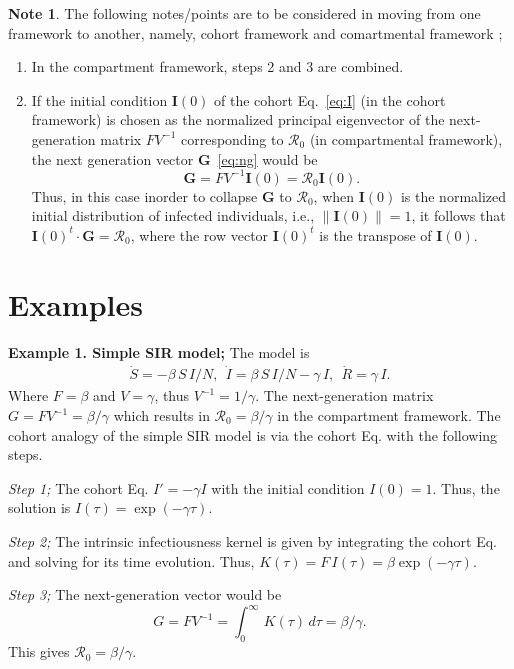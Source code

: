 \documentclass[12pt]{article}
\DeclareRobustCommand\_{\ifmmode\expandafter\subtxt\else\textunderscore\fi}
\newcommand{\R}{\ensuremath{\mathcal{R}_0}}
\renewcommand{\vec}[1]{\ensuremath{\mathbf{#1}}} %
\theoremstyle{definition} %
\newtheorem{note}{Note}
\begin{document}
\begin{note}
The following notes/points are to be considered in moving from one framework to another, namely, cohort framework \citep{champredon2018equivalence} and comartmental framework \citep{van2002reproduction}; 
\begin{enumerate}
\item
In the compartment framework, steps 2 and 3 are combined.
\item
If the initial condition $\vec I(0)$ of the cohort Eq.~\eqref{eq:I} (in the cohort framework) is chosen as the normalized principal eigenvector of the next-generation matrix $FV^{-1}$ corresponding to $\R$ (in compartmental framework), the next generation vector $\vec G$~\eqref{eq:ng} would be 
\begin{equation}
\vec G = FV^{-1} \vec I(0) = \R \vec I(0).
\end{equation}
Thus, in this case inorder to collapse $\vec G$ to $\R$, when $\vec I(0)$ is the normalized initial distribution of infected individuals, i.e., $\lVert \vec I(0) \rVert = 1$, it follows that $\vec I(0)^t \cdot \vec G = \R$, where the row vector $\vec I(0)^t$ is the transpose of $\vec I(0)$.
\end{enumerate}
\end{note}


\section{Examples}

{\bf Example 1. Simple SIR model;}
The model is
\begin{align}\label{mo:sir}
\dot S=-\beta\,S\,I/N,~~
\dot I= \beta\,S\,I/N -\gamma\,I,~~
\dot R= \gamma\,I.
\end{align}
Where $F=\beta$ and $V=\gamma$, thus $V^{-1}=1/\gamma$. The next-generation matrix $G=FV^{-1}=\beta/\gamma$ which results in $\R=\beta/\gamma$ in the compartment framework.
The cohort analogy of the simple SIR model is via the cohort Eq. with the following steps.

{\it Step 1;} The cohort Eq. $I'=-\gamma I$ with the initial condition $I(0)=1$. Thus, the solution is $I(\tau)=\exp(-\gamma \tau)$. 

{\it Step 2;} The intrinsic infectiousness kernel is given by integrating the cohort Eq. and solving for its time evolution.  Thus, $K(\tau)=F\,I(\tau)=\beta \exp(-\gamma \tau)$.

{\it Step 3;} The next-generation vector would be 
$$G=FV^{-1}=\int_0^\infty\,K(\tau)\,d\tau=\beta/\gamma.$$ This gives $\R=\beta/\gamma$. 
\end{document}
